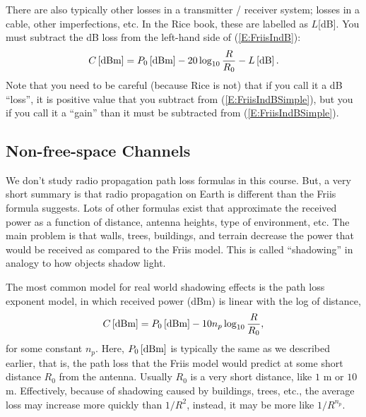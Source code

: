 
There are also typically other losses in a transmitter / receiver system; losses in a cable, other imperfections, etc.  In the Rice book, these are labelled as $L$[dB]. You must subtract the dB loss from the left-hand side of (\ref{E:FriisIndB}):
\begin{equation} \label{E:FriisIndBSimpleLoss}
 {C}\left[\mbox{dBm}\right] = {P_0}\left[\mbox{dBm}\right] - 20 \log_{10} \frac{R}{R_0} -{L}\left[\mbox{dB}\right].
\end{equation}
Note that you need to be careful (because Rice is not) that if you call it a dB ``loss'', it is positive value that you subtract from (\ref{E:FriisIndBSimple}), but you if you call it a ``gain'' than it must be subtracted from (\ref{E:FriisIndBSimple}).



\subsection{Non-free-space Channels}

We don't study radio propagation path loss formulas in this course.  But, a very short summary is that radio propagation on Earth is different than the Friis formula suggests. Lots of other formulas exist that approximate the received power as a function of distance, antenna heights, type of environment, etc.  The main problem is that walls, trees, buildings, and terrain decrease the power that would be received as compared to the Friis model.  This is called ``shadowing'' in analogy to how objects shadow light.

The most common model for real world shadowing effects is the path loss exponent model, in which received power (dBm) is linear with the log of distance,
\begin{equation} \label{E:PLExponentModel}
  {C}\left[\mbox{dBm}\right] = {P_0}\left[\mbox{dBm}\right] - 10n_p \log_{10}\frac{R}{R_0},
\end{equation}
for some constant $n_p$. Here, ${P_0}\left[\mbox{dBm}\right]$ is typically the same as we described earlier, that is, the path loss that the Friis model would predict at some short distance $R_0$ from the antenna.  Usually $R_0$ is a very short distance, like $1$ m or $10$ m. Effectively, because of shadowing caused by buildings, trees,
etc., the average loss may increase more quickly than $1/R^2$, instead, it may be more like $1/R^{n_p}$.  

